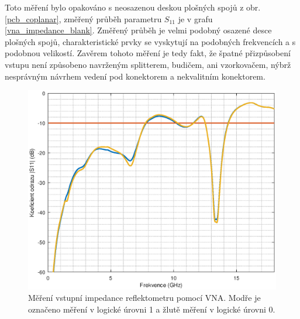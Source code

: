 Toto měření bylo opakováno s neosazenou deskou plošných spojů z obr. \ref{pcb_coplanar}, změřený průběh parametru $S_{11}$ je v grafu \ref{vna_impedance_blank}. Změřený průběh je velmi podobný osazené desce plošných spojů, charakteristické prvky se vyskytují na podobných frekvencích a s podobnou velikostí. Zavěrem tohoto měření je tedy fakt, že špatné přizpůsobení vstupu není způsobeno navrženým splitterem, budičem, ani vzorkovačem, nýbrž nesprávným návrhem vedení pod konektorem a nekvalitním konektorem.

\begin{figure}[htbp]
\includegraphics[width=\textwidth,keepaspectratio]{images/measurements/vna_high_low.eps}\caption{Měření vstupní impedance reflektometru pomocí VNA. Modře je označeno měření v logické úrovni 1 a žlutě měření v logické úrovni 0.}\label{vna_impedance}
\end{figure}

